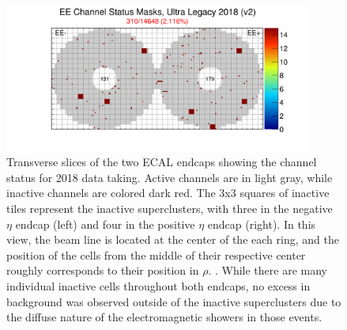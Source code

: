 \begin{figure}[h]
    \includegraphics[width=0.9\textwidth]{figures/EEChannelMasks.png}
    \centering
	\caption[Masked ECAL cells]{Transverse slices of the two ECAL endcaps showing the channel status for 2018 data taking. Active channels are in light gray, while inactive channels are colored dark red. The 3x3 squares of inactive tiles represent the inactive superclusters, with three in the negative $\eta$ endcap (left) and four in the positive $\eta$ endcap (right). In this view, the beam line is located at the center of the each ring, and the position of the cells from the middle of their respective center roughly corresponds to their position in $\rho$. \cite{EcalDPG}. While there are many individual inactive cells throughout both endcaps, no excess in background was observed outside of the inactive superclusters due to the diffuse nature of the electromagnetic showers in those events.}
    \label{fig:EEmasks}
\end{figure}

